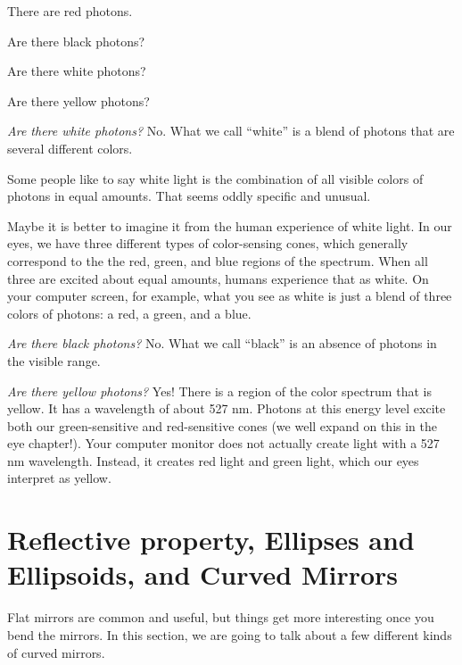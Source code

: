 \begin{Exercise}[title={Photons and Color}, label=photon_color]

  There are red photons.

  Are there black photons?

  Are there white photons?

  Are there yellow photons?
  
\end{Exercise}
\begin{Answer}
  
\textit{Are there white photons?}  No. What we call ``white'' is a
blend of photons that are several different colors.

Some people like to say white light is the combination of all visible
colors of photons in equal amounts. That seems oddly specific and unusual.

Maybe it is better to imagine it from the human experience of white
light. In our eyes, we have three different types of color-sensing
cones, which generally correspond to the the red, green, and
blue regions of the spectrum. When all three are excited about equal
amounts, humans experience that as white. On your computer screen,
for example, what you see as white is just a blend of three colors of
photons: a red, a green, and a blue.

\textit{Are there black photons?}  No. What we call ``black'' is an
absence of photons in the visible range.

\textit{Are there yellow photons?} Yes! There is a region of the color
spectrum that is yellow. It has a wavelength of about 527 nm. Photons
at this energy level excite both our green-sensitive and red-sensitive
cones (we well expand on this in the eye chapter!).
Your computer monitor does not actually create light with a 527 nm
wavelength. Instead, it creates red light and green light, which our
eyes interpret as yellow.

\end{Answer}

\section{Reflective property, Ellipses and Ellipsoids, and Curved Mirrors}

Flat mirrors are common and useful, but things get more interesting
once you bend the mirrors. In this section, we are going to talk about
a few different kinds of curved mirrors.

